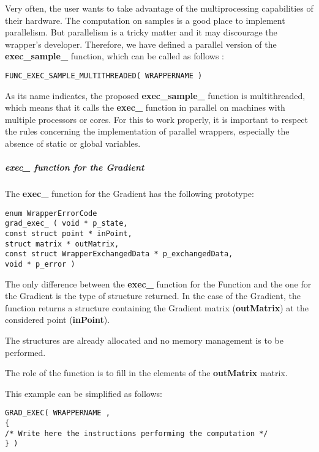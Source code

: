 Very often, the user wants to take advantage of the multiprocessing capabilities of their hardware. The computation on samples is a good place to implement parallelism. But parallelism is a tricky matter and it may discourage the wrapper's developer. Therefore, we have defined a parallel version of the {\bf exec\_sample\_} function, which can be called as follows :
\lstset{language=C++, basicstyle=\normalsize}
\begin{lstlisting}[frame=TBRL]
FUNC_EXEC_SAMPLE_MULTITHREADED( WRAPPERNAME )
\end{lstlisting}

As its name indicates, the proposed {\bf exec\_sample\_} function is multithreaded, which means that it calls the {\bf exec\_} function in parallel on machines with multiple processors or cores. For this to work properly, it is important to respect the rules concerning the implementation of parallel wrappers, especially the absence of static or global variables.

\subparagraph{exec\_ function for the Gradient}

The {\bf exec\_} function for the Gradient has the following prototype:

\lstset{language=C++, basicstyle=\normalsize}
\begin{lstlisting}[frame=TBRL]
enum WrapperErrorCode
grad_exec_ ( void * p_state,
const struct point * inPoint,
struct matrix * outMatrix,
const struct WrapperExchangedData * p_exchangedData,
void * p_error )
\end{lstlisting}

The only difference between the {\bf exec\_} function for the Function and the one for the Gradient is the type of structure returned. In the case of the Gradient, the function returns a  structure containing the Gradient matrix ({\bf outMatrix}) at the considered point ({\bf inPoint}).

The structures are already allocated and no memory management is to be performed.

The role of the function is to fill in the elements of the {\bf outMatrix} matrix.

This example can be simplified as follows:
\lstset{language=C++, basicstyle=\normalsize}
\begin{lstlisting}[frame=TBRL]
GRAD_EXEC( WRAPPERNAME ,
{
/* Write here the instructions performing the computation */
} )
\end{lstlisting}

